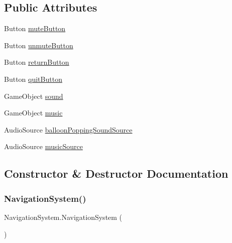 \subsection*{Public Attributes}
\begin{DoxyCompactItemize}
\item 
Button \hyperlink{classNavigationSystem_af874af0d57c8c4b9401f6500be74cac9}{mute\+Button}
\item 
Button \hyperlink{classNavigationSystem_aafe727ba79eb80a77896f1a86847821a}{unmute\+Button}
\item 
Button \hyperlink{classNavigationSystem_a52b2e61f4d6e5894361ec583b0409591}{return\+Button}
\item 
Button \hyperlink{classNavigationSystem_acf481922396a3e56ea1298b402d3772b}{quit\+Button}
\item 
Game\+Object \hyperlink{classNavigationSystem_a9615971bc837754d33c1309db26f87db}{sound}
\item 
Game\+Object \hyperlink{classNavigationSystem_a566c2333766ac052f92259c464938917}{music}
\item 
Audio\+Source \hyperlink{classNavigationSystem_a3afceb4b3fb3c292f9dec0328e6f1fad}{balloon\+Popping\+Sound\+Source}
\item 
Audio\+Source \hyperlink{classNavigationSystem_a1874027cc9fce9157c15005c9fc0387a}{music\+Source}
\end{DoxyCompactItemize}


\subsection{Constructor \& Destructor Documentation}
\mbox{\label{classNavigationSystem_a30234814ed20941b34e952561614b1ca}} 
\subsubsection{\texorpdfstring{Navigation\+System()}{NavigationSystem()}}
{\footnotesize\ttfamily Navigation\+System.\+Navigation\+System (\begin{DoxyParamCaption}{ }\end{DoxyParamCaption})\hspace{0.3cm}{\ttfamily [inline]}}



